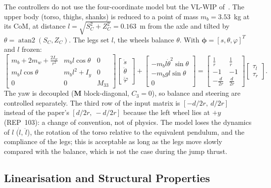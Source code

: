 \documentclass[11pt,a4paper]{article}
\newcommand{\bM}{\bm{M}}
\begin{document}
The controllers do not use the four-coordinate model but the VL-WIP of~\cite{cui2022}.  The
upper body (torso, thighs, shanks) is reduced to a point of mass $m_b = 3.53$~kg at its CoM, at
distance $l = \sqrt{S_C^2+Z_C^2} = 0.163$~m from the axle and tilted by
$\theta = \operatorname{atan2}(S_C, Z_C)$.  The legs set $l$, the wheels balance $\theta$.
With $\bm\phi = [s,\theta,\varphi]^T$ and $l$ frozen:
\begin{equation}
    \begin{bmatrix} m_b{+}2m_w{+}\frac{2I_w}{r^2} & m_b l\cos\theta & 0\\ m_b l\cos\theta & m_b l^2{+}I_y & 0\\ 0&0&M_{33}\end{bmatrix}
    \begin{bmatrix}\ddot s\\ \ddot\theta\\ \ddot\varphi\end{bmatrix}
    +\begin{bmatrix}-m_b l\dot\theta^2\sin\theta\\ -m_b g l\sin\theta\\ 0\end{bmatrix}
    =\begin{bmatrix}\frac1r & \frac1r\\ -1 & -1\\ -\frac{d}{2r} & \frac{d}{2r}\end{bmatrix}\begin{bmatrix}\tau_l\\ \tau_r\end{bmatrix}.
\end{equation}
The yaw is decoupled ($\bM$ block-diagonal, $C_3 = 0$), so balance and steering are controlled
separately.  The third row of the input matrix is $[-d/2r,\ d/2r]$ instead of the paper's
$[d/2r,\ -d/2r]$ because the left wheel lies at $+y$ (REP~103): a change of convention, not of
physics.  The model loses the dynamics of $l$ ($\dot l$, $\ddot l$), the rotation of the torso
relative to the equivalent pendulum, and the compliance of the legs; this is acceptable as long
as the legs move slowly compared with the balance, which is not the case during the jump thrust.

\subsection{Linearisation and Structural Properties}
\end{document}
